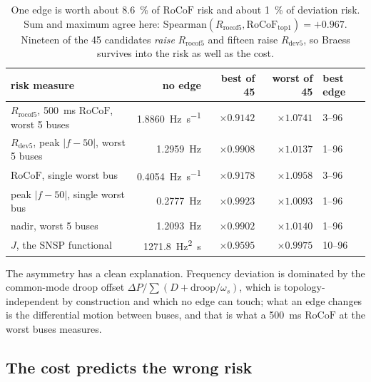 \documentclass[11pt,a4paper]{article}
\newcommand{\rocof}{\ensuremath{\mathrm{RoCoF}}}
\newcommand{\Rr}{\ensuremath{R_{\mathrm{rocof}5}}}
\newcommand{\Rd}{\ensuremath{R_{\mathrm{dev}5}}}
\begin{document}
\begin{table}[htbp]
\centering
\small
\begin{tabular}{lrrrl}
\toprule
risk measure & no edge & best of 45 & worst of 45 & best edge \\
\midrule
$\Rr$, \SI{500}{\milli\second} \rocof{}, worst 5 buses & \SI{1.8860}{\hertz\per\second} & $\times0.9142$ & $\times1.0741$ & 3--96\\
$\Rd$, peak $|f-50|$, worst 5 buses & \SI{1.2959}{\hertz} & $\times0.9908$ & $\times1.0137$ & 1--96\\
\rocof{}, single worst bus & \SI{0.4054}{\hertz\per\second} & $\times0.9178$ & $\times1.0958$ & 3--96\\
peak $|f-50|$, single worst bus & \SI{0.2777}{\hertz} & $\times0.9923$ & $\times1.0093$ & 1--96\\
nadir, worst 5 buses & \SI{1.2093}{\hertz} & $\times0.9902$ & $\times1.0140$ & 1--96\\
$J$, the SNSP functional & \SI{1271.8}{\hertz\squared\second} & $\times0.9595$ & $\times0.9975$ & 10--96\\
\bottomrule
\end{tabular}
\caption{One edge is worth about \SI{8.6}{\percent} of \rocof{} risk and about
\SI{1}{\percent} of deviation risk. Sum and maximum agree here:
Spearman$(\Rr,\rocof_{\text{top}1})=+0.967$. Nineteen of the 45 candidates
\emph{raise} $\Rr$ and fifteen raise $\Rd$, so Braess survives into the risk as
well as the cost.}
\label{tab:risk}
\end{table}

The asymmetry has a clean explanation. Frequency deviation is dominated by the
common-mode droop offset $\Delta P/\sum(D+\mathrm{droop}/\omega_s)$, which is
topology-independent by construction and which no edge can touch; what an edge
changes is the differential motion between buses, and that is what a
\SI{500}{\milli\second} \rocof{} at the worst buses measures.

\subsection{The cost predicts the wrong risk}
\end{document}

